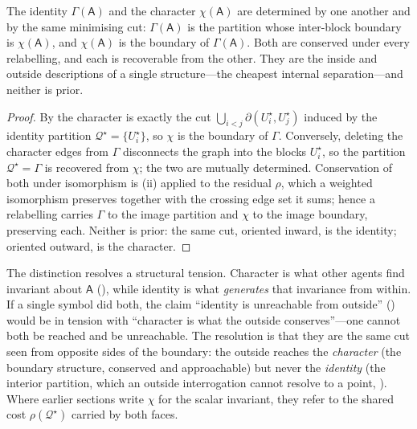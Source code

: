 \documentclass[11pt,twocolumn,a4paper]{article}
\newcommand{\Agent}{\mathsf{A}}
\newcommand{\Self}{\Gamma}          %
\newcommand{\cut}{\partial}
\newcommand{\Char}{\chi}             %
\begin{document}
\begin{theorem}
\label{thm:idchar}
The identity $\Self(\Agent)$ and the character $\Char(\Agent)$ are
determined by one another and by the same minimising cut: $\Self(\Agent)$
is the partition whose inter-block boundary is $\Char(\Agent)$, and
$\Char(\Agent)$ is the boundary of $\Self(\Agent)$. Both are conserved
under every relabelling, and each is recoverable from the other. They are
the inside and outside descriptions of a single structure---the cheapest
internal separation---and neither is prior.
\end{theorem}

\begin{proof}
By  the character is exactly the cut $\bigcup_{i<j}
\cut(U^\star_i,U^\star_j)$ induced by the identity partition
$\mathcal{Q}^\star=\{U^\star_i\}$, so $\Char$ is the boundary of $\Self$.
Conversely, deleting the character edges from $\Self$ disconnects the graph
into the blocks $U^\star_i$, so the partition $\mathcal{Q}^\star=\Self$ is
recovered from $\Char$; the two are mutually determined. Conservation of
both under isomorphism is (ii) applied to the residual
$\rho$, which a weighted isomorphism preserves together with the crossing
edge set it sums; hence a relabelling carries $\Self$ to the image
partition and $\Char$ to the image boundary, preserving each. Neither is
prior: the same cut, oriented inward, is the identity; oriented outward, is
the character.
\end{proof}

\begin{remark}
\label{rem:idchar}
The distinction resolves a structural tension. Character is what other
agents find invariant about $\Agent$ (), while
identity is what \emph{generates} that invariance from within. If a single
symbol did both, the claim ``identity is unreachable from outside''
() would be in tension with ``character is what the
outside conserves''---one cannot both be reached and be unreachable. The
resolution is that they are the same cut seen from opposite sides of the
boundary: the outside reaches the \emph{character} (the boundary structure,
conserved and approachable) but never the \emph{identity} (the interior
partition, which an outside interrogation cannot resolve to a point,
). Where earlier sections write $\Char$ for the
scalar invariant, they refer to the shared cost $\rho(\mathcal{Q}^\star)$
carried by both faces.
\end{remark}
\end{document}
